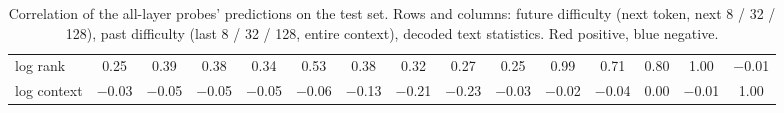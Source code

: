\begin{table}[H]
\begin{tabular}{lcccccccccccccc}
    log rank & \cellcolor{red!15}0.25 & \cellcolor{red!24}0.39 & \cellcolor{red!23}0.38 & \cellcolor{red!21}0.34 & \cellcolor{red!32}0.53 & \cellcolor{red!23}0.38 & \cellcolor{red!19}0.32 & \cellcolor{red!16}0.27 & \cellcolor{red!15}0.25 & \cellcolor{red!59}0.99 & \cellcolor{red!42}0.71 & \cellcolor{red!48}0.80 & \cellcolor{red!60}1.00 & \cellcolor{blue!1}$-$0.01 \\
    log context & \cellcolor{blue!2}$-$0.03 & \cellcolor{blue!3}$-$0.05 & \cellcolor{blue!3}$-$0.05 & \cellcolor{blue!3}$-$0.05 & \cellcolor{blue!3}$-$0.06 & \cellcolor{blue!8}$-$0.13 & \cellcolor{blue!13}$-$0.21 & \cellcolor{blue!14}$-$0.23 & \cellcolor{blue!2}$-$0.03 & \cellcolor{blue!1}$-$0.02 & \cellcolor{blue!2}$-$0.04 & \cellcolor{red!0}0.00 & \cellcolor{blue!1}$-$0.01 & \cellcolor{red!60}1.00 \\
  \end{tabular}
  \caption{Correlation of the all-layer probes' predictions on the test set. Rows and columns: future difficulty (next token, next 8 / 32 / 128), past difficulty (last 8 / 32 / 128, entire context), decoded text statistics. Red positive, blue negative.}
  \label{tab:probe-corr}
\end{table}

